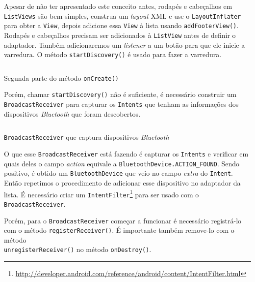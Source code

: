 \documentclass[a4paper,12pt,brazil,oneside]{book}
\begin{document}
	Apesar de não ter apresentado este conceito antes, rodapés e cabeçalhos em \texttt{ListViews} são bem simples, construa um \emph{layout} XML e use o \texttt{LayoutInflater} para obter a \texttt{View}, depois adicione essa \texttt{View} à lista usando \texttt{addFooterView()}. Rodapés e cabeçalhos precisam ser adicionados à \texttt{ListView} antes de definir o adaptador. Também adicionaremos um \emph{listener} a um botão para que ele inicie a varredura. O método \texttt{startDiscovery()} é usado para fazer a varredura.

	\begin{listing}[H]
	\inputminted[linenos=true,fontsize=\small,frame=lines, framesep=2mm, tabsize=2,numbersep=5pt]{java}{src/api/bluetooth/oncreate2.java}
	\caption{Segunda parte do método \texttt{onCreate()}}
	\label{code:bluetooth-oncreate2}
	\end{listing} 			

	Porém, chamar \texttt{startDiscovery()} não é suficiente, é necessário construir um \\ \texttt{BroadcastReceiver} para capturar os \texttt{Intents} que tenham as informações dos dispositivos \emph{Bluetooth} que foram descobertos.

	\begin{listing}[H]
	\inputminted[linenos=true,fontsize=\small,frame=lines, framesep=2mm, tabsize=2,numbersep=5pt]{java}{src/api/bluetooth/broadcast.java}
	\caption{\texttt{BroadcastReceiver} que captura dispositivos \emph{Bluetooth}}
	\label{code:bluetooth-broadcastreceiver}
	\end{listing} 			

	O que esse \texttt{BroadcastReceiver} está fazendo é capturar os \texttt{Intents} e verificar em quais deles o campo \emph{action} equivale a \texttt{BluetoothDevice.ACTION\_FOUND}. Sendo positivo, é obtido um \texttt{BluetoothDevice} que veio no campo \emph{extra} do \texttt{Intent}. Então repetimos o procedimento de adicionar esse dispositivo no adaptador da lista. É necessário criar um \texttt{IntentFilter}\footnote{\href{http://developer.android.com/reference/android/content/IntentFilter.html}{http://developer.android.com/reference/android/content/IntentFilter.html}} para ser usado com o \texttt{BroadcastReceiver}.

	Porém, para o \texttt{BroadcastReceiver} começar a funcionar é necessário registrá-lo com o método \texttt{registerReceiver()}. É importante também remove-lo com o método \\ \texttt{unregisterReceiver()} no método \texttt{onDestroy()}.
\end{document}
